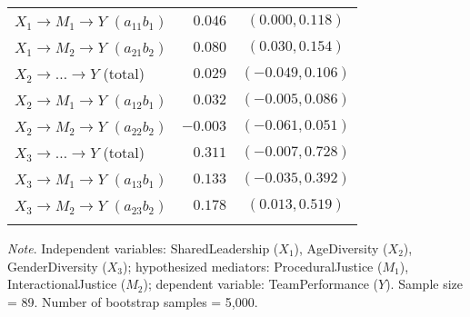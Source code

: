 \documentclass{article}\usepackage[]{graphicx}\usepackage[]{xcolor}
\begin{document}
\begin{table}[h!]
\begin{center}
\begin{tabular}{lrrrr}
$X_{1} \rightarrow M_{1} \rightarrow Y$ $(a_{11}b_{1})$ & $0.046$ & \multicolumn{3}{c}{$(0.000, 0.118)$} \\ 
$X_{1} \rightarrow M_{2} \rightarrow Y$ $(a_{21}b_{2})$ & $0.080$ & \multicolumn{3}{c}{$(0.030, 0.154)$} \\ 
$X_{2} \rightarrow  \ldots  \rightarrow Y$ (total) & $0.029$ & \multicolumn{3}{c}{$(-0.049, 0.106)$} \\ 
$X_{2} \rightarrow M_{1} \rightarrow Y$ $(a_{12}b_{1})$ & $0.032$ & \multicolumn{3}{c}{$(-0.005, 0.086)$} \\ 
$X_{2} \rightarrow M_{2} \rightarrow Y$ $(a_{22}b_{2})$ & $-0.003$ & \multicolumn{3}{c}{$(-0.061, 0.051)$} \\ 
$X_{3} \rightarrow  \ldots  \rightarrow Y$ (total) & $0.311$ & \multicolumn{3}{c}{$(-0.007, 0.728)$} \\ 
$X_{3} \rightarrow M_{1} \rightarrow Y$ $(a_{13}b_{1})$ & $0.133$ & \multicolumn{3}{c}{$(-0.035, 0.392)$} \\ 
$X_{3} \rightarrow M_{2} \rightarrow Y$ $(a_{23}b_{2})$ & $0.178$ & \multicolumn{3}{c}{$(0.013, 0.519)$} \\ 
\noalign{\smallskip}\hline
\end{tabular}
\end{center}
\emph{Note}. Independent variables: SharedLeadership ($X_{1}$), AgeDiversity ($X_{2}$), GenderDiversity ($X_{3}$); hypothesized mediators: ProceduralJustice ($M_{1}$), InteractionalJustice ($M_{2}$); dependent variable: TeamPerformance ($Y$). Sample size = 89. Number of bootstrap samples = 5,000. 

\end{table}
\end{document}
